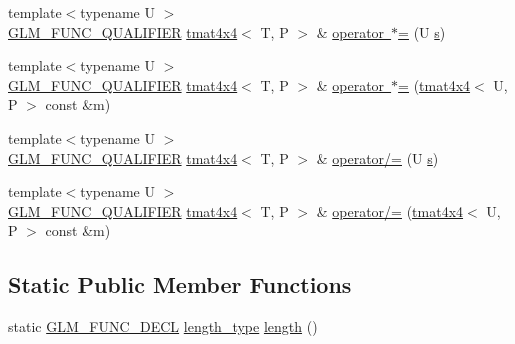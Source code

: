 \begin{DoxyCompactItemize}
\item 
{\footnotesize template$<$typename U $>$ }\\\mbox{\hyperlink{setup_8hpp_a33fdea6f91c5f834105f7415e2a64407}{G\+L\+M\+\_\+\+F\+U\+N\+C\+\_\+\+Q\+U\+A\+L\+I\+F\+I\+ER}} \mbox{\hyperlink{structglm_1_1tmat4x4}{tmat4x4}}$<$ T, P $>$ \& \mbox{\hyperlink{structglm_1_1tmat4x4_ac01c13a88416b79f6688d4de0553407a}{operator $\ast$=}} (U \mbox{\hyperlink{glad_8h_af1b1d5edfea6a34daee7389b1b5810ad}{s}})
\item 
{\footnotesize template$<$typename U $>$ }\\\mbox{\hyperlink{setup_8hpp_a33fdea6f91c5f834105f7415e2a64407}{G\+L\+M\+\_\+\+F\+U\+N\+C\+\_\+\+Q\+U\+A\+L\+I\+F\+I\+ER}} \mbox{\hyperlink{structglm_1_1tmat4x4}{tmat4x4}}$<$ T, P $>$ \& \mbox{\hyperlink{structglm_1_1tmat4x4_a5089e74fff684e04a1a81f9f25f7fd90}{operator $\ast$=}} (\mbox{\hyperlink{structglm_1_1tmat4x4}{tmat4x4}}$<$ U, P $>$ const \&m)
\item 
{\footnotesize template$<$typename U $>$ }\\\mbox{\hyperlink{setup_8hpp_a33fdea6f91c5f834105f7415e2a64407}{G\+L\+M\+\_\+\+F\+U\+N\+C\+\_\+\+Q\+U\+A\+L\+I\+F\+I\+ER}} \mbox{\hyperlink{structglm_1_1tmat4x4}{tmat4x4}}$<$ T, P $>$ \& \mbox{\hyperlink{structglm_1_1tmat4x4_ad7713e2bf039546e1799fe53f28d91ff}{operator/=}} (U \mbox{\hyperlink{glad_8h_af1b1d5edfea6a34daee7389b1b5810ad}{s}})
\item 
{\footnotesize template$<$typename U $>$ }\\\mbox{\hyperlink{setup_8hpp_a33fdea6f91c5f834105f7415e2a64407}{G\+L\+M\+\_\+\+F\+U\+N\+C\+\_\+\+Q\+U\+A\+L\+I\+F\+I\+ER}} \mbox{\hyperlink{structglm_1_1tmat4x4}{tmat4x4}}$<$ T, P $>$ \& \mbox{\hyperlink{structglm_1_1tmat4x4_abd9e65e0368e0cd8e977586f6a8706d4}{operator/=}} (\mbox{\hyperlink{structglm_1_1tmat4x4}{tmat4x4}}$<$ U, P $>$ const \&m)
\end{DoxyCompactItemize}
\subsection*{Static Public Member Functions}
\begin{DoxyCompactItemize}
\item 
static \mbox{\hyperlink{setup_8hpp_ab2d052de21a70539923e9bcbf6e83a51}{G\+L\+M\+\_\+\+F\+U\+N\+C\+\_\+\+D\+E\+CL}} \mbox{\hyperlink{structglm_1_1tmat4x4_aff2734210dc0f3c3c60c49bb1f3e8864}{length\+\_\+type}} \mbox{\hyperlink{structglm_1_1tmat4x4_aaa9ea3c2a377939018c48646b3768311}{length}} ()
\end{DoxyCompactItemize}


